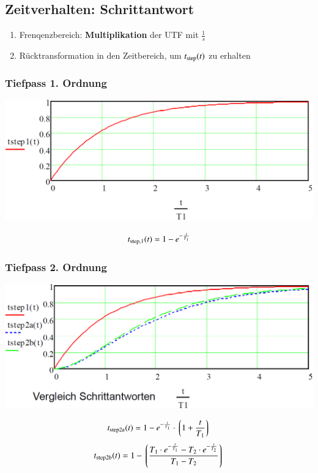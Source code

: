 \subsection{Zeitverhalten: Schrittantwort}

\begin{enumerate}
    \item Frenqenzbereich: \textbf{Multiplikation} der UTF mit $\frac{1}{s}$
    \item Rücktransformation in den Zeitbereich, um $t_{\rm step}(t)$ zu erhalten
\end{enumerate}


\subsubsection{Tiefpass 1. Ordnung}

\begin{minipage}[c]{0.48\columnwidth}
    \includegraphics[width=\columnwidth]{images/schrittantwort_tp_ordnung_1.png}
\end{minipage}
\hfill
\begin{minipage}[c]{0.48\columnwidth}
    $$  t_{\rm step,1}(t) = 1 - e^{- \frac{t}{T_1}} $$
\end{minipage}


\subsubsection{Tiefpass 2. Ordnung}

\begin{minipage}[c]{0.43\columnwidth}
    \includegraphics[width=\columnwidth]{images/schrittantworten_vergleich.png}
\end{minipage}
\hfill
\begin{minipage}[c]{0.55\columnwidth}
    $$ t_{\rm step2a}(t) = 1 - e^{- \frac{t}{T_1}}\cdot \left\lgroup 1 + \frac{t}{T_1} \right\rgroup $$
    $$ t_{\rm step2b}(t) = 1 - \left\lgroup \frac{T_1 \cdot e^{- \frac{t}{T_1}} - T_2 \cdot e^{- \frac{t}{T_2}}}{T_1 - T_2} \right\rgroup $$
\end{minipage}


